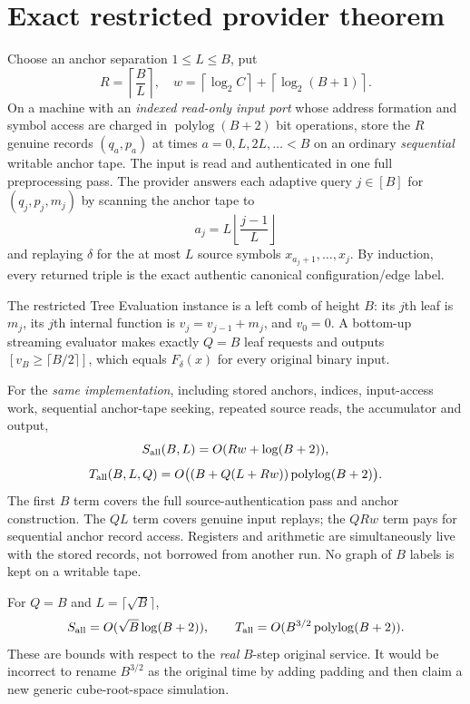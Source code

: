 \documentclass[11pt]{article}
\begin{document}
\section{Exact restricted provider theorem}
Choose an anchor separation $1\le L\le B$, put
\[
R=\left\lceil\frac{B}{L}\right\rceil,\quad
w=\left\lceil\log_2 C\right\rceil+
  \left\lceil\log_2(B+1)\right\rceil.
\]
On a machine with an \emph{indexed read-only input port} whose 
address formation and symbol access are charged in 
$\operatorname{polylog}(B+2)$ bit operations, store the 
$R$ genuine records $(q_a,p_a)$ at times 
$a=0,L,2L,\ldots<B$ on an ordinary \emph{sequential} 
writable anchor tape. The input is read and authenticated in 
one full preprocessing pass. The provider answers each adaptive 
query $j\in[B]$ for $(q_j,p_j,m_j)$ by scanning the anchor 
tape to
\[
a_j=L\left\lfloor\frac{j-1}{L}\right\rfloor
\]
and replaying $\delta$ for the at most $L$ source symbols 
$x_{a_j+1},\ldots,x_j$. By induction, every returned triple 
is the exact authentic canonical configuration/edge label.

The restricted Tree Evaluation instance is a left comb of
height $B$: its $j$th leaf is $m_j$, its $j$th 
internal function is $v_j=v_{j-1}+m_j$, and $v_0=0$.
A bottom-up streaming evaluator makes exactly $Q=B$ 
leaf requests and outputs $[v_B\ge\lceil B/2\rceil]$,
which equals $F_\delta(x)$ for every original binary input.

For the \emph{same implementation}, including stored anchors, 
indices, input-access work, sequential anchor-tape seeking,
repeated source reads, the accumulator and output,
\[
S_{\rm all}(B,L)=O(Rw+\log(B+2)),
\]
\[
T_{\rm all}(B,L,Q)=
O\bigl((B+Q(L+Rw))\operatorname{polylog}(B+2)\bigr).
\]
The first $B$ term covers the full source-authentication pass 
and anchor construction. The $Q L$ term covers genuine 
input replays; the $Q Rw$ term pays for sequential anchor 
record access. Registers and arithmetic are simultaneously 
live with the stored records, not borrowed from another run. 
No graph of $B$ labels is kept on a writable tape.

For $Q=B$ and $L=\lceil\sqrt B\rceil$,
\[
S_{\rm all}=O(\sqrt B\log(B+2)),\qquad
T_{\rm all}=O(B^{3/2}\operatorname{polylog}(B+2)).
\]
These are bounds with respect to the \emph{real} $B$-step 
original service. It would be incorrect to rename 
$B^{3/2}$ as the original time by adding padding and then 
claim a new generic cube-root-space simulation.
\end{document}
